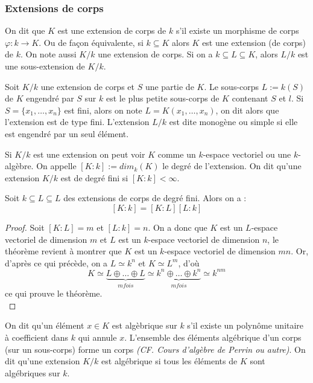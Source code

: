 \documentclass[a4paper]{article} %
\numberwithin{equation}{section}
\begin{document}
{\subsubsection{Extensions de corps}
On dit que $K$ est une extension de corps de $k$ s'il existe un morphisme de corps 
$\varphi : k \to K$. Ou de façon équivalente, si $k \subseteq K$ alors $K$ est une 
extension (de corps) de $k$. On note aussi $K/k$ une extension de corps.
Si on a $k\subseteq L \subseteq K$, alors $L/k$ est une sous-extension de
$K/k$.\par
Soit $K/k$ une extension de corps et $S$ une partie de $K$. Le sous-corps $L := 
k(S)$ de $K$ engendré par $S$ sur $k$ est le plus petite sous-corps de $K$ contenant 
$S$ et $l$. Si $S = \lbrace x_1,\dots,x_n \rbrace$ est fini, alors on note $L = 
K(x_1,\dots,x_n)$, on dit alors que l'extension est de type fini. L'extension $L/k$ 
est dite monogène ou simple si elle est engendré par un seul élément.\par
Si $K/k$ est une extension on peut voir $K$ comme un $k$-espace vectoriel ou une 
$k$-algèbre. On appelle $[K:k] := dim_k(K)$ le degré de l'extension. On dit qu'une 
extension $K/k$ est de degré fini si $[K:k] < \infty$.\par

\begin{thm}
Soit $k \subseteq L \subseteq L$ des extensions de corps de degré fini. Alors on a :
\[[K:k] = [K:L][L:k]\]
\end{thm}
\begin{proof}
Soit $[K:L] = m$ et $[L:k] = n$. On a donc que $K$ est un $L$-espace vectoriel de dimension $m$ et $L$ est un $k$-espace vectoriel de dimension $n$, le théorème revient à montrer que $K$ est un $k$-espace vectoriel de dimension $mn$. Or, d'après ce qui précède, on a $L \simeq k^n$ et $K \simeq L^m$, d'où
\[K \simeq \underbrace{L \oplus\dots\oplus L}_{m fois}\simeq\underbrace{k^n\oplus\dots\oplus k^n}_{m fois} \simeq k^{nm}\]
ce qui prouve le théorème.\\
\end{proof}

On dit qu'un élément $x\in K$ est algèbrique sur $k$ s'il existe un polynôme unitaire à coefficient dans $k$ qui annule $x$. L'ensemble des éléments algébrique d'un corps (sur un sous-corps) forme un corps \textit{(CF. Cours d'algèbre de Perrin ou autre)}. On dit qu'une extension $K/k$ est algébrique si tous les éléments de $K$ sont algébriques sur $k$.

}
\end{document}
